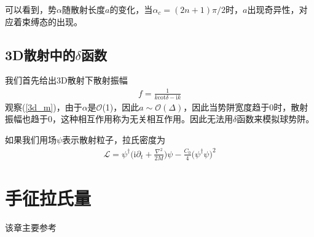 \documentclass[aps,tightenlines,16pt]{ctexart}
\numberwithin{equation}{section}
\newcommand{\mO}{\mathcal{O}}
\newcommand{\mL}{\mathcal{L}}
\begin{document}
可以看到，势$\alpha$随散射长度$a$的变化，当$\alpha_c=(2n+1)\pi/2$时，$a$出现奇异性，对应着束缚态的出现。

\subsection{3D散射中的$\delta$函数}

我们首先给出3D散射下散射振幅
\begin{align}
   f=\frac{1}{k\mbox{cot}\delta-\mbox{i}k}
\end{align}
观察(\ref{3d_m})，由于$\alpha$是$\mO$(1)，因此$a\sim\mO(\Delta)$，因此当势阱宽度趋于0时，散射振幅也趋于0，这种相互作用称为无关相互作用。因此无法用$\delta$函数来模拟球势阱。

如果我们用场$\psi$表示散射粒子，拉氏密度为
\begin{align}
   \mL = \psi^{\dagger}\Big(\mbox{i}\partial_t+\frac{\nabla^2}{2M}\Big)\psi-\frac{C_0}{4}\Big(\psi^{\dagger}\psi\Big)^2
\end{align}


\section{手征拉氏量}
该章主要参考\cite{scherer2011primer}





    
\newpage 

\renewcommand\refname{参考文献}




\end{document}
